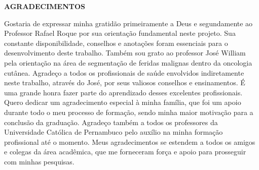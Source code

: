 \begin{acronym}
	\acro{}{}
         \acro{}{}
         \acro{}{}
\end{acronym}

\begin{center}
    \textbf{AGRADECIMENTOS}
\end{center}

    Gostaria de expressar minha gratidão primeiramente a Deus e segundamente ao Professor Rafael Roque por sua orientação fundamental neste projeto. Sua constante disponibilidade, conselhos e anotações foram essenciais para o desenvolvimento deste trabalho. Também sou grato ao professor José William pela orientação na área de segmentação de feridas malignas dentro da oncologia cutânea. Agradeço a todos os profissionais de saúde envolvidos indiretamente neste trabalho, através do José, por seus valiosos conselhos e ensinamentos. É uma grande honra fazer parte do aprendizado desses excelentes profissionais. Quero dedicar um agradecimento especial à minha família, que foi um apoio durante todo o meu processo de formação, sendo minha maior motivação para a conclusão da graduação. Agradeço também a todos os professores da Universidade Católica de Pernambuco pelo auxílio na minha formação profissional até o momento. Meus agradecimentos se estendem a todos os amigos e colegas da área acadêmica, que me forneceram força e apoio para prosseguir com minhas pesquisas.
  	


